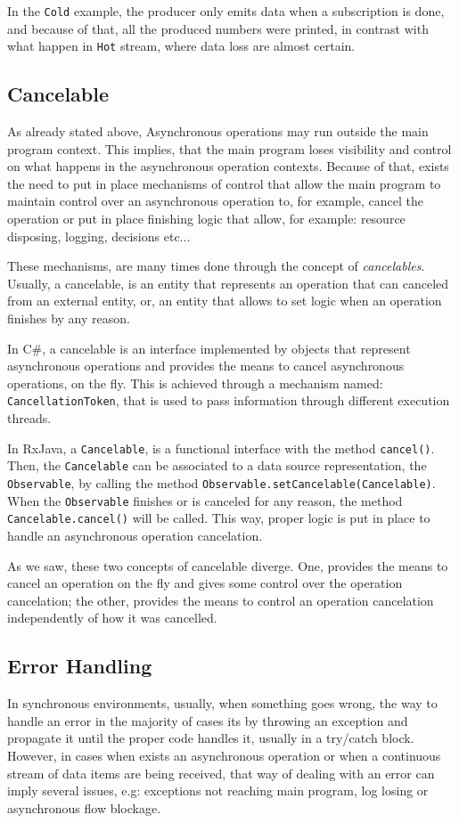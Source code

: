 	In the \texttt{Cold} example, the producer only emits data when a subscription is done, and because of that, all the produced numbers were printed, in contrast with what happen in \texttt{Hot} stream, where data loss are almost certain. 
	\clearpage
	\subsection{Cancelable} 
	As already stated above, Asynchronous operations may run outside the main program context. 
	This implies, that the main program loses visibility and control on what happens in the asynchronous operation contexts.
	Because of that, exists the need to put in place mechanisms of control that allow the main program to maintain control over an asynchronous operation to, for example, cancel the operation or put in place finishing logic that allow, for example: resource disposing, logging, decisions etc...

	These mechanisms, are many times done through the concept of \textit{cancelables}. 
	Usually, a cancelable, is an entity that represents an operation that can canceled from an external entity, or, an entity that allows to set logic when an operation finishes by any reason.
 
	In C\#, a cancelable is an interface implemented by objects that represent asynchronous operations and provides the means to cancel asynchronous operations, on the fly. 
	This is achieved through a mechanism named: \texttt{CancellationToken}, that is used to pass information through different execution threads. 
	
	In RxJava, a \texttt{Cancelable}, is a functional interface with the method \texttt{cancel()}. Then, the \texttt{Cancelable} can be associated to a data source representation, the \texttt{Observable}, by calling the method \texttt{Observable.setCancelable(Cancelable)}. 
	When the \texttt{Observable} finishes or is canceled for any reason, the method \texttt{Cancelable.cancel()} will be called. 
	This way,  proper logic is put in place to handle an asynchronous operation cancelation.
	
	As we saw, these two concepts of cancelable diverge. One, provides the means to cancel an operation on the fly and gives some control over the operation cancelation; the other, provides the means to control an operation cancelation independently of how it was cancelled.
	
	\clearpage
	\subsection{Error Handling}  
	In synchronous environments, usually, when something goes wrong, the way to handle an error in the majority of cases its by throwing an exception and propagate it until the proper code handles it, usually  in a try/catch block. 
	However, in cases when exists an asynchronous operation or when a continuous stream of data items are being received, that way of dealing with an error can imply several issues, e.g: exceptions not reaching main program, log losing or asynchronous flow blockage. 
	
